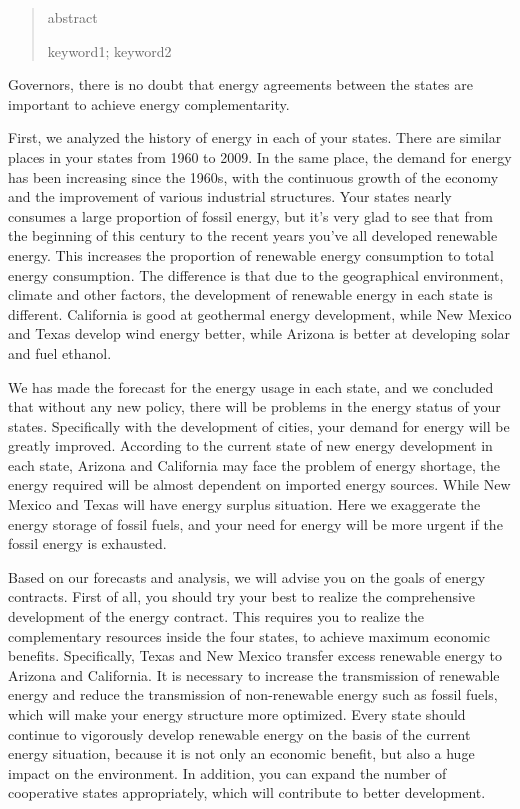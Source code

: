 \documentclass{mcmthesis}
\title{}
\begin{document}
\begin{abstract}
abstract
\begin{keywords}
keyword1; keyword2
\end{keywords}
\end{abstract}
\maketitle

\newpage
\pagestyle{fancy} 
\rhead{\small\sffamily}
Governors, there is no doubt that energy agreements between the states are important to achieve energy complementarity.

First, we analyzed the history of energy in each of your states.  There are similar places in your states from 1960 to 2009. In the same place, the demand for energy has been increasing since the 1960s, with the continuous growth of the economy and the improvement of various industrial structures. Your states nearly consumes a large proportion of fossil energy, but it's very glad to see that from the beginning of this century to the recent years you've all developed renewable energy. This increases the proportion of renewable energy consumption to total energy consumption. 
The difference is that due to the geographical environment, climate and other factors, the development of renewable energy in each state is different. California is good at geothermal energy development, while New Mexico and Texas develop wind energy better, while Arizona is better at developing solar and fuel ethanol.

We has made the forecast for the energy usage in each state, and we concluded that without any new policy, there will be problems in the energy status of your states.
Specifically with the development of cities, your demand for energy will be greatly improved. According to the current state of new energy development in each state, Arizona and California may face the problem of energy shortage, the energy required will be almost dependent on imported energy sources. While New Mexico and Texas will have energy surplus situation.
Here we exaggerate the energy storage of fossil fuels, and your need for energy will be more urgent if the fossil energy is exhausted.

Based on our forecasts and analysis, we will advise you on the goals of energy contracts. First of all, you should try your best to realize the comprehensive development of the energy contract. This requires you to realize the complementary resources inside the four states, to achieve maximum economic benefits. Specifically, Texas and New Mexico transfer excess renewable energy to Arizona and California.
It is necessary to increase the transmission of renewable energy and reduce the transmission of non-renewable energy such as fossil fuels, which will make your energy structure more optimized.
Every state should continue to vigorously develop renewable energy on the basis of the current energy situation, because it is not only an economic benefit, but also a huge impact on the environment. In addition, you can expand the number of cooperative states appropriately, which will contribute to better development.
\end{document}
